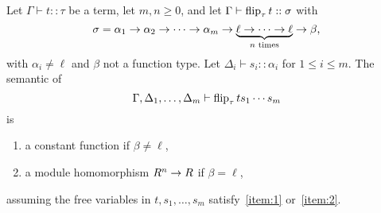 \begin{lemma}
  \label{th:lininference}
  Let $\Gamma\vdash t::\tau$ be a term, let $m,n\ge0$, and let
  $\Gamma\vdash \operatorname{flip}_{\tau}t::\sigma$ with
  \begin{equation}
    \label{eq:264}
    \sigma=\alpha_1\rightarrow\alpha_2\rightarrow\cdots\rightarrow\alpha_m\rightarrow\underbrace{\ell\rightarrow\cdots\rightarrow\ell}_{\text{$n$ times}}\rightarrow\beta
    \text{,}    
  \end{equation}
  with $\alpha_i\ne\ell$ and $\beta$ not a function type. Let
  $\Delta_i\vdash s_i::\alpha_i$ for $1\le i\le m$. The semantic of
  \begin{equation}
    \label{eq:270}
    \Gamma,\Delta_1,\ldots,\Delta_m\vdash \operatorname{flip}_\tau ts_1\cdots s_m
  \end{equation}
  is
  \begin{enumerate}
  \item\label{item:1} a constant function if $\beta\ne\ell$,
  \item\label{item:2} a module homomorphism $R^n\rightarrow R$ if $\beta=\ell$,
  \end{enumerate}
  assuming the free variables in $t,s_1,\ldots,s_m$
  satisfy~\ref{item:1} or~\ref{item:2}.
\end{lemma}
